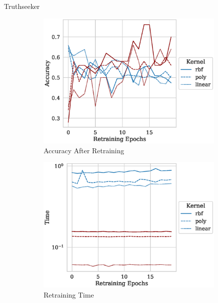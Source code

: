 \documentclass{beamer}
\begin{document}
\begin{frame}{Truthseeker}
    \begin{figure}
     \centering
     \begin{subfigure}{0.4\textwidth}
         \centering
         \includegraphics[width=\textwidth]{./truthseeker/retrain_accuracy.eps}
         \caption{Accuracy After Retraining}
     \end{subfigure}
     \hfill
     \begin{subfigure}{0.4\textwidth}
         \centering
         \includegraphics[width=\textwidth]{./truthseeker/retrain_time.eps}
         \caption{Retraining Time}
     \end{subfigure}
     \hfill
     \begin{subfigure}{0.4\textwidth}

\end{subfigure}
\end{figure}
\end{frame}
\end{document}
